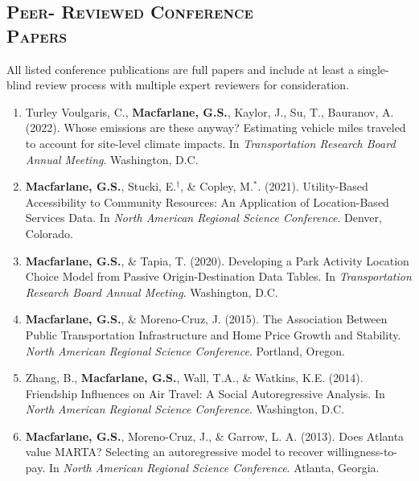 \documentclass[margin,line]{res}
\newif\ifdetail
\newcounter{enuminitialize}
\newenvironment{myenum}[1][]
{%
 \setcounter{enuminitialize}{#1}
 \addtocounter{enuminitialize}{2}
 \begin{enumerate}[left= 4pt, itemsep=12pt, start=\value{enuminitialize}, label=\arabic*\addtocounter{enumi}{-2}]
}
{%
 \end{enumerate}
}
\newcommand{\secfont}{\scshape }
\begin{document}
\begin{resume}

\noindent\makebox[\linewidth]{\rule{\linewidth}{0.4pt}}
\section{\secfont Peer- Reviewed Conference \\ Papers}
All listed conference publications are full papers and include at least a
single-blind review process with multiple expert reviewers for consideration.
\ifdetail Papers 1 and 2 resulted from my undergraduate honors thesis, papers 3 through 5
resulted from my doctoral work, and items 6 through 8 represent work completed since joining the faculty at BYU.\fi
\vspace{.3cm}
\begin{myenum}[8]
\item Turley Voulgaris, C., \textbf{Macfarlane, G.S.}, Kaylor, J., Su, T., Bauranov, A. (2022). Whose emissions are these anyway? Estimating vehicle miles traveled to account for site-level climate impacts. In \textit{Transportation Research Board Annual Meeting}. Washington, D.C.

\item \textbf{Macfarlane, G.S.}, Stucki,  E.$^\dagger$,  \& Copley, M.$^*$. (2021). Utility-Based Accessibility to Community Resources: An Application of Location-Based Services Data. In \textit{North American Regional Science Conference}. Denver, Colorado.

\item \textbf{Macfarlane, G.S.}, \& Tapia, T. (2020). Developing a Park Activity Location Choice Model from Passive Origin-Destination Data Tables. In \textit{ Transportation Research Board Annual Meeting}. Washington, D.C.

\item \textbf{Macfarlane, G.S.}, \& Moreno-Cruz, J. (2015). The Association Between Public Transportation Infrastructure and Home Price Growth and Stability. \textit{North American Regional Science Conference}. Portland, Oregon.

\item Zhang, B., \textbf{Macfarlane, G.S.}, Wall, T.A., \& Watkins, K.E. (2014). Friendship Influences on Air Travel: A Social Autoregressive Analysis. In \textit{ North American Regional Science Conference}. Washington, D.C.

\item \textbf{Macfarlane, G.S.}, Moreno-Cruz, J., \& Garrow, L. A. (2013). Does Atlanta value MARTA? Selecting an autoregressive model to recover willingness-to-pay. In \textit{ North American Regional Science Conference}. Atlanta, Georgia.


\end{myenum}
\end{resume}
\end{document}

